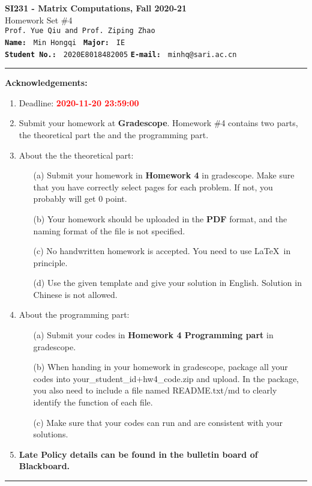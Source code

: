\documentclass[english,onecolumn]{IEEEtran}
\begin{document}
\begin{center}
	\textbf{\LARGE{SI231 - Matrix Computations, Fall 2020-21}}\\
	{\Large Homework Set \#4}\\
	\texttt{Prof. Yue Qiu and Prof. Ziping Zhao}\\
	\texttt{\textbf{Name:}}   	\texttt{ Min Hongqi }  		\hspace{1bp}
	\texttt{\textbf{Major:}}  	\texttt{ IE } 	\\
	\texttt{\textbf{Student No.:}} 	\texttt{ 2020E8018482005}     \hspace{1bp}
	\texttt{\textbf{E-mail:}} 	\texttt{ minhq@sari.ac.cn}
\par\end{center}

\noindent
\rule{\linewidth}{0.4pt}
{\bf {\large Acknowledgements:}}
\begin{enumerate}
    \item Deadline: \textcolor{red}{\textbf{2020-11-20 23:59:00}}
    \item Submit your homework at \textbf{Gradescope}.
    Homework \#4 contains two parts, the theoretical part the and the programming part.
    \item About the the theoretical part:
    \begin{enumerate}
            \item[(a)] Submit your homework in \textbf{Homework 4} in gradescope. Make sure that you have correctly select pages for each problem. If not, you probably will get 0 point.
            \item[(b)] Your homework should be uploaded in the \textbf{PDF} format, and the naming format of the file is not specified.
            \item[(c)] No handwritten homework is accepted. You need to use \LaTeX $\,$ in principle.
            \item[(d)] Use the given template and give your solution in English. Solution in Chinese is not allowed. 
        \end{enumerate}
  \item About the programming part:
  \begin{enumerate}
      \item[(a)] Submit your codes in \textbf{Homework 4 Programming part} in gradescope. 
      \item[(b)] When handing in your homework in gradescope, package all your codes into {\sf your\_student\_id+hw4\_code.zip} and upload. In the package, you also need to include a file named {\sf README.txt/md} to clearly identify the function of each file.
     \item[(c)] Make sure that your codes can run and are consistent with your solutions.
  \end{enumerate}
  \item \textbf{Late Policy details can be found in the bulletin board of Blackboard.}
\end{enumerate}
\rule{\linewidth}{0.4pt}
\end{document}
